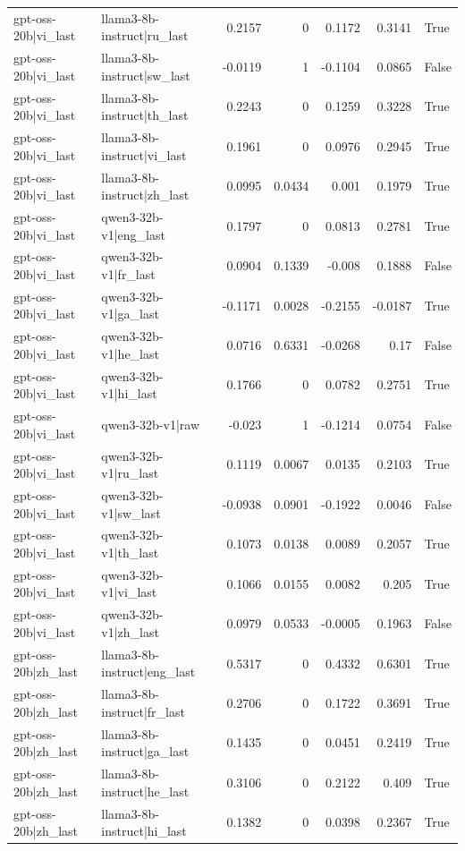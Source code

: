 \begin{table}
\begin{tabular}{l l r r r r l}
gpt-oss-20b|vi_last & llama3-8b-instruct|ru_last & 0.2157 & 0 & 0.1172 & 0.3141 & True \\
gpt-oss-20b|vi_last & llama3-8b-instruct|sw_last & -0.0119 & 1 & -0.1104 & 0.0865 & False \\
gpt-oss-20b|vi_last & llama3-8b-instruct|th_last & 0.2243 & 0 & 0.1259 & 0.3228 & True \\
gpt-oss-20b|vi_last & llama3-8b-instruct|vi_last & 0.1961 & 0 & 0.0976 & 0.2945 & True \\
gpt-oss-20b|vi_last & llama3-8b-instruct|zh_last & 0.0995 & 0.0434 & 0.001 & 0.1979 & True \\
gpt-oss-20b|vi_last & qwen3-32b-v1|eng_last & 0.1797 & 0 & 0.0813 & 0.2781 & True \\
gpt-oss-20b|vi_last & qwen3-32b-v1|fr_last & 0.0904 & 0.1339 & -0.008 & 0.1888 & False \\
gpt-oss-20b|vi_last & qwen3-32b-v1|ga_last & -0.1171 & 0.0028 & -0.2155 & -0.0187 & True \\
gpt-oss-20b|vi_last & qwen3-32b-v1|he_last & 0.0716 & 0.6331 & -0.0268 & 0.17 & False \\
gpt-oss-20b|vi_last & qwen3-32b-v1|hi_last & 0.1766 & 0 & 0.0782 & 0.2751 & True \\
gpt-oss-20b|vi_last & qwen3-32b-v1|raw & -0.023 & 1 & -0.1214 & 0.0754 & False \\
gpt-oss-20b|vi_last & qwen3-32b-v1|ru_last & 0.1119 & 0.0067 & 0.0135 & 0.2103 & True \\
gpt-oss-20b|vi_last & qwen3-32b-v1|sw_last & -0.0938 & 0.0901 & -0.1922 & 0.0046 & False \\
gpt-oss-20b|vi_last & qwen3-32b-v1|th_last & 0.1073 & 0.0138 & 0.0089 & 0.2057 & True \\
gpt-oss-20b|vi_last & qwen3-32b-v1|vi_last & 0.1066 & 0.0155 & 0.0082 & 0.205 & True \\
gpt-oss-20b|vi_last & qwen3-32b-v1|zh_last & 0.0979 & 0.0533 & -0.0005 & 0.1963 & False \\
gpt-oss-20b|zh_last & llama3-8b-instruct|eng_last & 0.5317 & 0 & 0.4332 & 0.6301 & True \\
gpt-oss-20b|zh_last & llama3-8b-instruct|fr_last & 0.2706 & 0 & 0.1722 & 0.3691 & True \\
gpt-oss-20b|zh_last & llama3-8b-instruct|ga_last & 0.1435 & 0 & 0.0451 & 0.2419 & True \\
gpt-oss-20b|zh_last & llama3-8b-instruct|he_last & 0.3106 & 0 & 0.2122 & 0.409 & True \\
gpt-oss-20b|zh_last & llama3-8b-instruct|hi_last & 0.1382 & 0 & 0.0398 & 0.2367 & True \\

\end{tabular}
\end{table}
